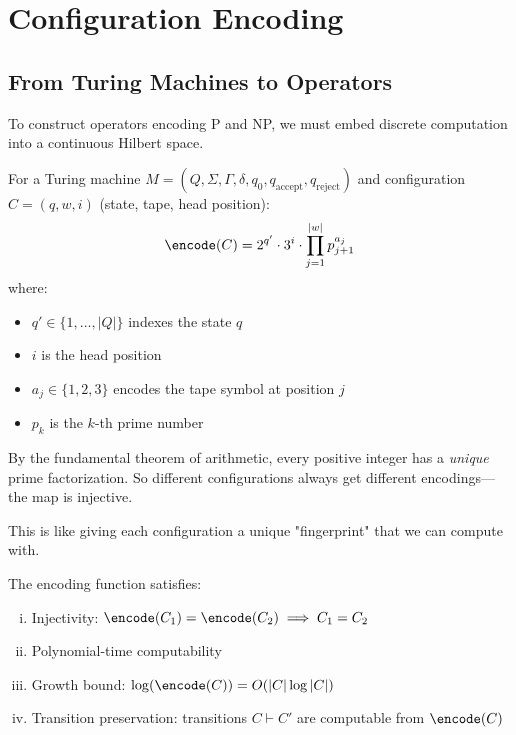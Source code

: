 \section{Configuration Encoding}

\subsection{From Turing Machines to Operators}

To construct operators encoding P and NP, we must embed discrete computation into a continuous Hilbert space.

\begin{definition}\label{def:config-encoding}
For a Turing machine $M = (Q, \Sigma, \Gamma, \delta, q_0, q_{\text{accept}}, q_{\text{reject}})$ and configuration $C = (q, w, i)$ (state, tape, head position):
\begin{equation}
\encode(C) = 2^{q'} \cdot 3^{i} \cdot \prod_{j=1}^{|w|} p_{j+1}^{a_j}
\end{equation}
where:
\begin{itemize}
\item $q' \in \{1, \ldots, |Q|\}$ indexes the state $q$
\item $i$ is the head position
\item $a_j \in \{1,2,3\}$ encodes the tape symbol at position $j$
\item $p_k$ is the $k$-th prime number
\end{itemize}
\end{definition}

\begin{intuitive}
By the fundamental theorem of arithmetic, every positive integer has a \textit{unique} prime factorization. So different configurations always get different encodings—the map is injective.

This is like giving each configuration a unique "fingerprint" that we can compute with.
\end{intuitive}

\begin{lemma}\label{lem:encoding-props}
The encoding function satisfies:
\begin{enumerate}[(i)]
\item Injectivity: $\encode(C_1) = \encode(C_2) \implies C_1 = C_2$
\item Polynomial-time computability
\item Growth bound: $\log(\encode(C)) = O(|C| \log |C|)$
\item Transition preservation: transitions $C \vdash C'$ are computable from $\encode(C)$
\end{enumerate}
\end{lemma}

